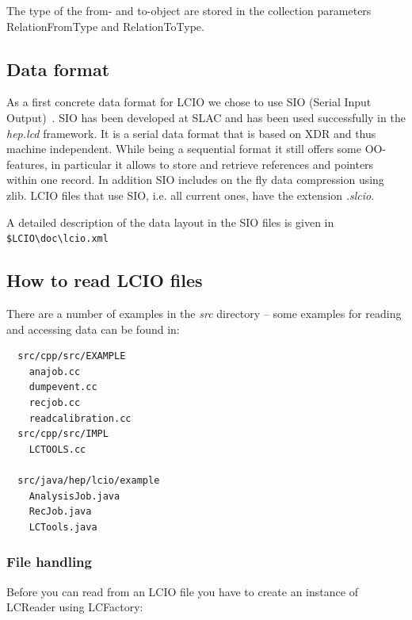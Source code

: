 \documentclass[twoside]{article}
\begin{document}
The type of the from- and to-object are stored in the collection parameters RelationFromType and RelationToType.


\subsection{Data format \label{sec_sio}}

As a first concrete data format for LCIO we chose to use SIO (Serial Input Output)~\cite{sio_doc}.
SIO has been developed at SLAC and has been used successfully in the {\em hep.lcd}
framework. It is a serial data format that is based on XDR and thus machine 
independent. While being a sequential format it still offers some OO-features, in 
particular it allows to store and retrieve references and pointers within one record.
In addition SIO includes on the fly data compression using zlib.
LCIO files that use SIO, i.e. all current ones, have the extension {\em .slcio}.

A detailed description of the data layout in the SIO files is given in \verb# $LCIO\doc\lcio.xml# %


\subsection{How to read LCIO files} \label{read_examples} 
There are a number of examples in the {\em src} directory -- 
some examples for reading and accessing data can be found in:
\begin{verbatim}
  src/cpp/src/EXAMPLE
    anajob.cc
    dumpevent.cc
    recjob.cc
    readcalibration.cc
  src/cpp/src/IMPL
    LCTOOLS.cc

  src/java/hep/lcio/example
    AnalysisJob.java
    RecJob.java
    LCTools.java
\end{verbatim}

\subsubsection{File handling} 
Before you can read from an LCIO file you have to create an instance of LCReader using LCFactory:
\end{document}
